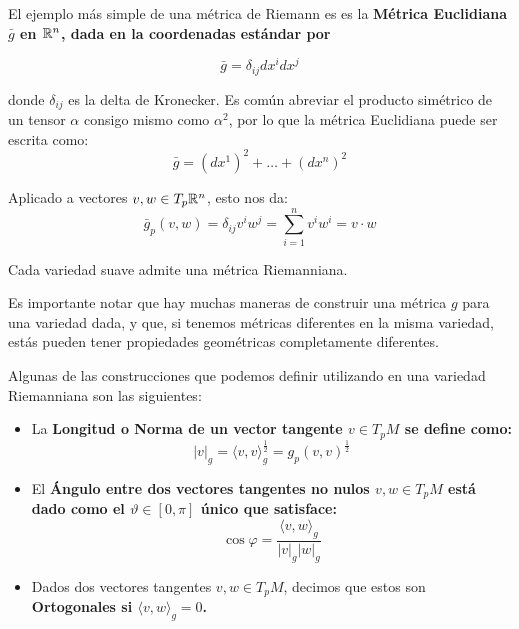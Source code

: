\begin{frame}
  \begin{example}
  El ejemplo más simple de una métrica de Riemann es es la \bf{Métrica Euclidiana} $\bar{g}$ en $\Bbb{R}^n$, dada en la coordenadas estándar por

  \[
    \bar{g} = \delta_{ij}dx^{i}dx^j
  \]

  donde $\delta_{ij}$ es la delta de Kronecker. Es común abreviar el producto simétrico de un tensor $\alpha$ consigo mismo como $\alpha^2$, por lo que la métrica Euclidiana puede ser escrita como:
  \[
    \bar{g} = (dx^1)^2 + \hdots + (dx^n)^2
  \]

  Aplicado a vectores $v,w \in T_p\Bbb{R}^n$, esto nos da:
  \[
    \bar{g}_p (v,w) = \delta_{ij}v^i w^j = \sum_{i=1}^n v^i w^i = v \cdot w
  \]
  \end{example}
\end{frame}

\begin{frame}
  \begin{theorem}    
    Cada variedad suave admite una métrica Riemanniana.
  \end{theorem} \pause

  Es importante notar que hay muchas maneras de construir una métrica $g$ para una variedad dada, y que, si tenemos métricas diferentes en la misma variedad, estás pueden tener propiedades geométricas completamente diferentes.
\end{frame}

\begin{frame}
  Algunas de las construcciones que podemos definir utilizando en una variedad Riemanniana son las siguientes:\pause
 \begin{itemize}
   \item La \bf{Longitud} o \bf{Norma} de un vector tangente $v \in T_p M$ se define como:
     \[
       |v|_g = \langle v,v \rangle_g^{\frac{1}{2}} = g_p (v,v)^{\frac{1}{2}}
     \] \pause
   \item El \bf{Ángulo} entre dos vectores tangentes no nulos $v,w \in T_p M$ está dado como el $\vartheta \in [0,\pi]$ único que satisface:
     \[
       \cos \varphi = \frac{\langle v,w \rangle_g}{|v|_g |w|_g}
     \] \pause
    \item Dados dos vectores tangentes $v,w \in T_pM$, decimos que estos son \bf{Ortogonales} si $\langle v,w\rangle_g = 0$.
 \end{itemize} 
\end{frame}

